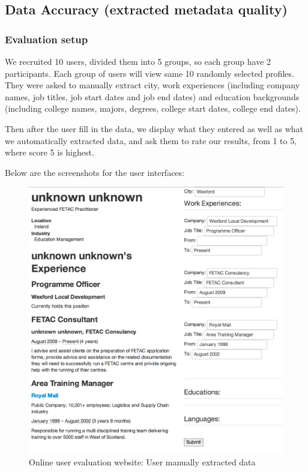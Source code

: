 \subsection{Data Accuracy (extracted metadata quality)}

\subsubsection{Evaluation setup}

We recruited 10 users, divided them into 5 groups, so each group have 2 participants. Each group of users will view same 10 randomly selected profiles. They were asked to manually extract city, work experiences (including company names, job titles, job start dates and job end dates) and education backgrounds (including college names, majors, degrees, college start dates, college end dates).

Then after the user fill in the data, we display what they entered as well as what we automatically extracted data, and ask them to rate our results, from 1 to 5, where score 5 is highest.

Below are the screenshots for the user interfaces:

\begin{figure}[H]
	\centering
	\includegraphics[width=1.0\textwidth]{images/user-input.png}
	\caption{Online user evaluation website: User manually extracted data\protect}
	\label{fig:UserInput}
\end{figure}


